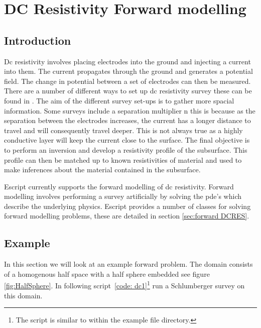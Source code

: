 %
%
%

\chapter{DC Resistivity Forward modelling}\label{Chp:cook:Dc Resistivity inversion}
\section{Introduction}
Dc resistivity involves placing electrodes into the ground and injecting a current
into them. The current propagates through the ground and generates a potential field.
The change in potential between a set of electrodes can then be measured. There are
a number of different ways to set up dc resistivity survey these can be found in
\cite[pg 5]{LOKE2014}. The aim of the different survey set-ups is to gather more
spacial information. Some surveys include a separation multiplier n this is because
as the separation between the electrodes increases, the current has a longer 
distance to travel and will consequently travel deeper. This is not always true
as a highly conductive layer will keep the current close to the surface.
The final objective is to perform an inversion and develop a resistivity profile of the subsurface.
This profile can then be matched up to known resistivities of material and used 
to make inferences about the material contained in the subsurface.

Escript currently supports the forward modelling of dc resistivity. Forward modelling
involves performing a survey artificially by solving the pde's which describe the underlying
physics. Escript provides a number of classes for solving forward modelling problems, these are
detailed in section \ref{sec:forward DCRES}. 

\section{Example}
In this section we will look at an example forward problem. The domain consists of
a homogenous half space with a half sphere embedded see figure \ref{fig:HalfSphere}. 
In following script~\ref{code: dc1}\footnote{The script is similar to
 within the \escript example file directory.} run a 
Schlumberger survey on this domain.

